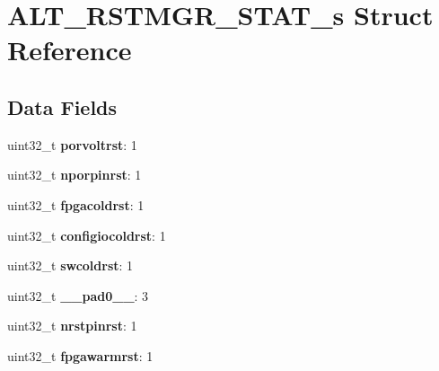 \hypertarget{structALT__RSTMGR__STAT__s}{}\section{A\+L\+T\+\_\+\+R\+S\+T\+M\+G\+R\+\_\+\+S\+T\+A\+T\+\_\+s Struct Reference}
\label{structALT__RSTMGR__STAT__s}
\subsection*{Data Fields}
\begin{DoxyCompactItemize}
\item 
\mbox{\label{structALT__RSTMGR__STAT__s_a7d4b88e9a7050f2298c91be2596cc59a}} 
uint32\+\_\+t {\bfseries porvoltrst}\+: 1
\item 
\mbox{\label{structALT__RSTMGR__STAT__s_a296813f9ec7610ae27db528f9126c591}} 
uint32\+\_\+t {\bfseries nporpinrst}\+: 1
\item 
\mbox{\label{structALT__RSTMGR__STAT__s_aafd1482f32dd1cdd541dc346a46bb3a2}} 
uint32\+\_\+t {\bfseries fpgacoldrst}\+: 1
\item 
\mbox{\label{structALT__RSTMGR__STAT__s_ad7612399ad340be306f0e6459fcb2e80}} 
uint32\+\_\+t {\bfseries configiocoldrst}\+: 1
\item 
\mbox{\label{structALT__RSTMGR__STAT__s_af8112cbcf6006a6c80b953c47fff775d}} 
uint32\+\_\+t {\bfseries swcoldrst}\+: 1
\item 
\mbox{\label{structALT__RSTMGR__STAT__s_abb23a39135aea06e18a6d7de663ac4b9}} 
uint32\+\_\+t {\bfseries \+\_\+\+\_\+pad0\+\_\+\+\_\+}\+: 3
\item 
\mbox{\label{structALT__RSTMGR__STAT__s_a6fcfb62dc23359b0ab0516fa434f976d}} 
uint32\+\_\+t {\bfseries nrstpinrst}\+: 1
\item 
\mbox{\label{structALT__RSTMGR__STAT__s_aacba56c9241c62f5d19999f3d29f0f82}} 
uint32\+\_\+t {\bfseries fpgawarmrst}\+: 1
\item 

\end{DoxyCompactItemize}
